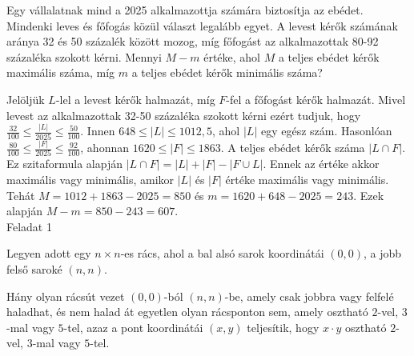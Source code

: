 \begin{extraproblem}
Egy vállalatnak mind a 2025 alkalmazottja számára biztosítja az ebédet.
Mindenki leves és főfogás közül választ legalább egyet. A levest kérők
számának aránya 32 és 50 százalék között mozog, míg főfogást az alkalmazottak
80-92 százaléka szokott kérni. Mennyi $M-m$ értéke, ahol $M$ a teljes
ebédet kérők maximális száma, míg $m$ a teljes ebédet kérők minimális
száma? 
\end{extraproblem}

\begin{solution}
Jelöljük $L$-lel a levest kérők halmazát, míg $F$-fel a főfogást
kérők halmazát. Mivel levest az alkalmazottak 32-50 százaléka szokott
kérni ezért tudjuk, hogy $\frac{32}{100}\leq\frac{|L|}{2025}\leq\frac{50}{100}$.
Innen $648\leq|L|\leq1012,5$, ahol $|L|$ egy egész szám. Hasonlóan
$\frac{80}{100}\leq\frac{|F|}{2025}\leq\frac{92}{100}$, ahonnan $1620\leq|F|\leq1863$.
A teljes ebédet kérők száma $|L\cap F|$. Ez szitaformula alapján
$|L\cap F|=|L|+|F|-|F\cup L|$. Ennek az értéke akkor maximális vagy
minimális, amikor $|L|$ és $|F|$ értéke maximális vagy minimális.
Tehát $M=1012+1863-2025=850$ és $m=1620+648-2025=243$. Ezek alapján
$M-m=850-243=607$. \\
Feladat 1
\end{solution}
\begin{extraproblem}
Legyen adott egy $n\times n$-es rács, ahol a bal alsó sarok koordinátái
$(0,0)$, a jobb felső saroké $(n,n)$.

Hány olyan rácsút vezet $(0,0)$-ból $(n,n)$-be, amely csak jobbra
vagy felfelé haladhat, és nem halad át egyetlen olyan rácsponton sem,
amely osztható $2$-vel, $3$-mal vagy $5$-tel, azaz a pont koordinátái
$(x,y)$ teljesítik, hogy $x\cdot y$ osztható $2$-vel, $3$-mal
vagy $5$-tel.
\end{extraproblem}

